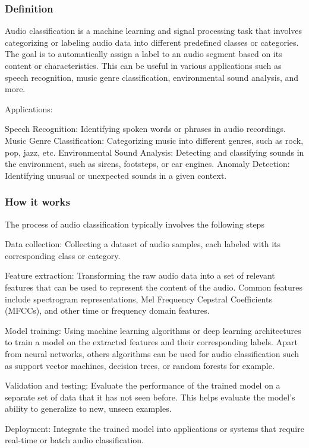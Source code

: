 \documentclass{article}
\begin{document}
\subsubsection{Definition}
{\color{blue}
  Audio classification is a machine learning and signal processing task that involves categorizing or labeling audio data into different predefined classes or categories. The goal is to automatically assign a label to an audio segment based on its content or characteristics. This can be useful in various applications such as speech recognition, music genre classification, environmental sound analysis, and more.

  Applications:

  Speech Recognition: Identifying spoken words or phrases in audio recordings.
  Music Genre Classification: Categorizing music into different genres, such as rock, pop, jazz, etc.
  Environmental Sound Analysis: Detecting and classifying sounds in the environment, such as sirens, footsteps, or car engines.
  Anomaly Detection: Identifying unusual or unexpected sounds in a given context.
}
\subsubsection{How it works}
{\color{blue}
  The process of audio classification typically involves the following steps

  Data collection: Collecting a dataset of audio samples, each labeled with its corresponding class or category.

  Feature extraction: Transforming the raw audio data into a set of relevant features that can be used to represent the content of the audio. Common features include spectrogram representations, Mel Frequency Cepstral Coefficients (MFCCs), and other time or frequency domain features.

  Model training: Using machine learning algorithms or deep learning architectures to train a model on the extracted features and their corresponding labels. Apart from neural networks, others algorithms can be used for audio classification such as support vector machines, decision trees, or random forests for example.

  Validation and testing: Evaluate the performance of the trained model on a separate set of data that it has not seen before. This helps evaluate the model's ability to generalize to new, unseen examples.

  Deployment: Integrate the trained model into applications or systems that require real-time or batch audio classification.
}
\end{document}
